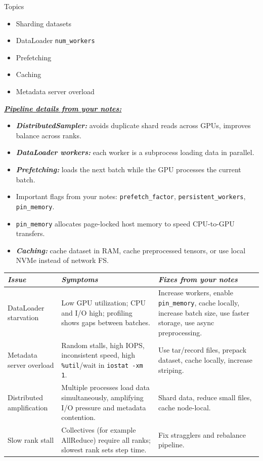 \documentclass[12pt]{article}
\newcommand{\keysent}[1]{\textbf{\textit{\uline{#1}}}}
\let\origtextbf\textbf
\renewcommand{\textbf}[1]{\origtextbf{\textit{#1}}}
\begin{document}
\begin{bluebox}{Topics}
\begin{itemize}
\item Sharding datasets
\item DataLoader \texttt{num\_workers}
\item Prefetching
\item Caching
\item Metadata server overload
\end{itemize}
\end{bluebox}

\keysent{Pipeline details from your notes:}
\begin{itemize}
\item \textbf{DistributedSampler:} avoids duplicate shard reads across GPUs, improves balance across ranks.
\item \textbf{DataLoader workers:} each worker is a subprocess loading data in parallel.
\item \textbf{Prefetching:} loads the next batch while the GPU processes the current batch.
\item Important flags from your notes: \texttt{prefetch\_factor}, \texttt{persistent\_workers}, \texttt{pin\_memory}.
\item \texttt{pin\_memory} allocates page-locked host memory to speed CPU-to-GPU transfers.
\item \textbf{Caching:} cache dataset in RAM, cache preprocessed tensors, or use local NVMe instead of network FS.
\end{itemize}

{\footnotesize
\begin{tabularx}{\textwidth}{|>{\raggedright\arraybackslash}p{3cm}|X|X|}
\hline
\textbf{Issue} & \textbf{Symptoms} & \textbf{Fixes from your notes} \\
\hline
DataLoader starvation & Low GPU utilization; CPU and I/O high; profiling shows gaps between batches. & Increase workers, enable \texttt{pin\_memory}, cache locally, increase batch size, use faster storage, use async preprocessing. \\
\hline
Metadata server overload & Random stalls, high IOPS, inconsistent speed, high \texttt{\%util}/wait in \texttt{iostat -xm 1}. & Use tar/record files, prepack dataset, cache locally, increase striping. \\
\hline
Distributed amplification & Multiple processes load data simultaneously, amplifying I/O pressure and metadata contention. & Shard data, reduce small files, cache node-local. \\
\hline
Slow rank stall & Collectives (for example AllReduce) require all ranks; slowest rank sets step time. & Fix stragglers and rebalance pipeline. \\
\hline
\end{tabularx}
}
\end{document}
